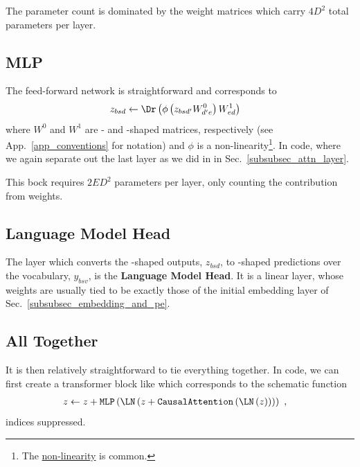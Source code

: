 \documentclass[11pt]{article}
\begin{document}
The parameter count is dominated by the weight matrices which carry $ 4 D ^{ 2 } $ total parameters per layer.


\subsection{MLP \label{subsubsec_mlp} }

The feed-forward network is straightforward and corresponds to
\begin{align}
	z _{ bsd } & \leftarrow \Dr \left (\phi \left ( z _{ bsd' }W ^{ 0 }_{ d'e } \right ) W ^{ 1 } _{ ed
	} \right ) \label{eq_mlp}
\end{align}
where $ W ^{ 0 } $ and $ W ^{ 1 } $ are - and -shaped matrices,
respectively (see App.~\ref{app_conventions} for notation) and $ \phi $ is a
non-linearity\footnote{The 
	\href{https://pytorch.org/docs/stable/generated/torch.nn.GELU.html}{non-linearity} is common.}.
In code, where we again separate out the last  layer as we did in in
Sec.~\ref{subsubsec_attn_layer}.  

This bock requires $ 2 E D ^{ 2 } $ parameters per layer, only counting the contribution from
weights.


\subsection{Language Model Head \label{subsubsec_language_model_head} }


The layer which converts the -shaped outputs, $ z _{ bsd } $, to -shaped
predictions over the vocabulary, $  y _{ bsv } $, is the \textbf{Language Model Head}. It
is a linear layer, whose weights are usually tied to be exactly those of the initial embedding
layer of Sec.~\ref{subsubsec_embedding_and_pe}.


\subsection{All Together}
It is then relatively straightforward to tie everything together.  In code, we can first create a
transformer block like
which corresponds to the schematic function
\begin{align}
	z & \leftarrow  z + \texttt{MLP}\left ( \LN \left ( z + \texttt{CausalAttention}\left ( \LN \left (
				z\right ) \right )  \right ) \right )\ ,
\end{align}
indices suppressed.
\end{document}
